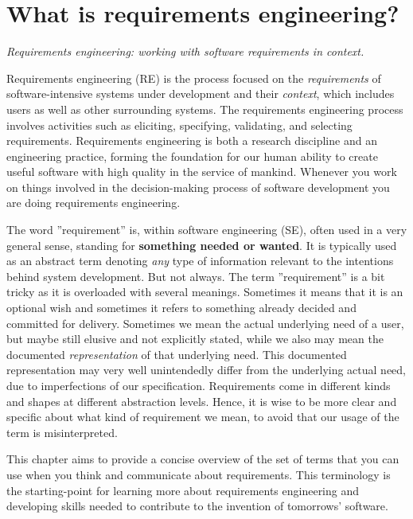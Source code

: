 
\chapter*{What is requirements engineering?}

\textit{Requirements engineering: working with software requirements in context.}

\vspace{1em}

\noindent Requirements engineering (RE) is the process focused on the \textit{requirements} of software-intensive systems under development and their \textit{context}, which includes users as well as other surrounding systems. 
The requirements engineering process involves activities such as eliciting, specifying, validating, and selecting requirements. 
Requirements engineering is both a research discipline and an engineering practice, forming the foundation for our human ability to create useful software with high quality in the service of mankind. Whenever you work on things involved in the decision-making process of software development you are doing requirements engineering.  

The word ''requirement'' is, within software engineering (SE), often used in a very general sense, standing for \textbf{something needed or wanted}. It is typically used as an abstract term denoting \textit{any} type of information relevant to the intentions behind system development. But not always. The term ''requirement'' is a bit tricky as it is overloaded with several meanings. Sometimes it means that it is an optional wish and sometimes it refers to something already decided and committed for delivery. Sometimes we mean the actual underlying need of a user, but maybe still elusive and not explicitly stated, while we also may mean the documented \textit{representation} of that underlying need. This documented representation may very well unintendedly differ from the underlying actual need, due to imperfections of our specification. Requirements come in different kinds and shapes at different abstraction levels. Hence, it is wise to be more clear and specific about what kind of requirement we mean, to avoid that our usage of the term is misinterpreted. 

This chapter aims to provide a concise overview of the set of terms that you can use when you think and communicate about requirements. This terminology is the starting-point for learning more about requirements engineering and developing skills needed to contribute to the invention of tomorrows' software.

